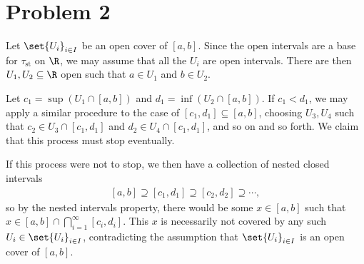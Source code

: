 \documentclass[10pt]{mypackage}
\begin{document}
\RaggedRight
\section{Problem 2}%
Let $\set{U_i}_{i\in I}$ be an open cover of $\left[ a,b \right]$. Since the open intervals are a base for $\tau_{\text{st}}$ on $\R$, we may assume that all the $U_i$ are open intervals. There are then $U_1,U_2\subseteq \R$ open such that $a\in U_1$ and $b\in U_2$.\newline

Let $c_1 = \sup\left( U_1\cap [a,b] \right)$ and $d_1 = \inf\left( U_2\cap [a,b] \right)$. If $c_1 < d_1$, we may apply a similar procedure to the case of $\left[ c_1,d_1 \right]\subseteq \left[ a,b \right]$, choosing $U_3,U_4$ such that $c_2\in U_3\cap \left[c_1,d_1\right]$ and $d_2\in U_4\cap \left[ c_1,d_1 \right]$, and so on and so forth. We claim that this process must stop eventually.\newline

If this process were not to stop, we then have a collection of nested closed intervals
\begin{align*}
  \left[ a,b \right] \supseteq \left[ c_1,d_1 \right]\supseteq \left[ c_2,d_2 \right]\supseteq \cdots,
\end{align*}
so by the nested intervals property, there would be some $x\in \left[ a,b \right]$ such that $x\in \left[ a,b \right]\cap \bigcap_{i=1}^{\infty}\left[ c_i,d_i \right]$. This $x$ is necessarily not covered by any such $U_i\in \set{U_i}_{i\in I}$, contradicting the assumption that $\set{U_i}_{i\in I}$ is an open cover of $\left[ a,b \right]$.
\end{document}
